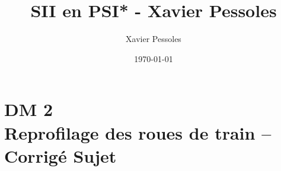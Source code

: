 \documentclass[
	fontsize=10pt, %
	twoside=true, %
]{kaobook}
\newcommand{\repRel}{../../../..}
\newcommand{\repStyle}{\repRel/Style}
\begin{document}

\titlehead{Document Template}
\title[SII en PSI* - Xavier Pessoles]{SII en PSI* - Xavier Pessoles}
\author[XP]{Xavier Pessoles}
\date{\today}

%
\frontmatter %


%
\mainmatter %


\setcounter{margintocdepth}{\sectiontocdepth}
\marginlayout
\graphicspath{{\repStyle/png}}

\pagestyle{xp.scrheadings}



\newcommand{\repExo}{}
\newcommand{\nomExo}{}

\livrettrue %
\collefalse\colletrue
\normaltrue
\proftrue

\newcommand{\exer}{\subsection*}

\chapter*{DM 2 \\ 
Reprofilage des roues de train -- 
\ifprof Corrigé \else Sujet \fi}


\renewcommand{\repExo}{\repRel/Sujets_Concours/2018/CCS_PSI_Tour/}
\renewcommand{\nomExo}{CCS_PSI_Tour_03_dm}

\graphicspath{{\repRel/Style/png/}{\repExo/images/}}

\end{document}
